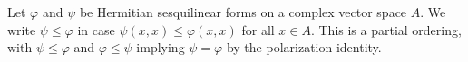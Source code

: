 Let $\varphi$ and $\psi$ be Hermitian sesquilinear forms on a complex vector space $A$. We write $\psi \leq \varphi$ in case $\psi(x, x) \leq \varphi(x, x)$ for all $x \in A$. This is a partial ordering, with $\psi \leq \varphi$ and $\varphi \leq \psi$ implying $\psi = \varphi$ by the polarization identity.
